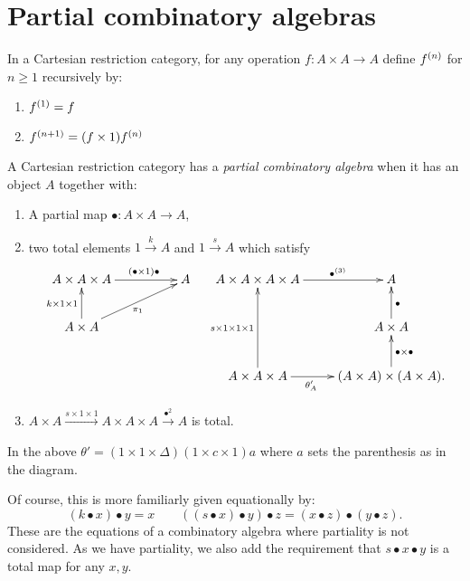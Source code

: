 \section{Partial combinatory algebras}
\label{sec:partial_combinatory_algebras}

In a Cartesian restriction category, for any operation $f:A\times A\to A$ define ${f}^{(n)}$
for $n\ge 1$  recursively by:
\begin{enumerate}[{(}i{)}]
  \item ${f}^{(1)} = f$
  \item ${f}^{(n+1)} = (f\times 1) {f}^{(n)}$
\end{enumerate}

\begin{definition}\label{def:partial_combinatory_algebra}
  A Cartesian restriction category has a \emph{partial combinatory algebra} when it has an object
  $A$ together with:
  \begin{enumerate}[{(}i{)}]
  \item A partial map $\bullet:A\times A \to A$,\label{defitem:pca-1}
  \item two total elements $1\xrightarrow{k}A$ and $1\xrightarrow{s}{A}$ which satisfy\label{defitem:pca-2}
    \[
      \xymatrix@C+25pt{
        A\times A\times A \ar[r]^(.6){(\bullet\times 1)\bullet} & A\\
        A\times A \ar[u]^{k\times1\times1} \ar[ur]_{\pi_1}
      }\quad
      \xymatrix{
        A\times A\times A\times A \ar[r]^(.6){\multibullet{3}}&A\\
        &A\times A \ar[u]_{\bullet}\\
        A\times A\times A \ar[uu]^{s\times1\times1\times1} \ar[r]_(.4){\theta_A'}
          & (A\times A) \times (A\times A). \ar[u]_{\bullet\times\bullet}
      }
    \]
    \item $A\times A \xrightarrow{s\times1\times1} A\times A\times A \xrightarrow{\bullet^2} A$ is total.\label{defitem:pca-3}
  \end{enumerate}
  In the above $\theta' = (1\times1\times\Delta)(1\times c \times 1)a$ where $a$ sets the
  parenthesis as in the diagram.
\end{definition}

Of course, this is more familiarly given equationally by:
\[
   (k\bullet x)\bullet y = x \qquad ((s\bullet x)\bullet y) \bullet z = (x\bullet z) \bullet
   (y\bullet z).
\]
These are the equations of a combinatory algebra where partiality is not considered. As we have
partiality, we also add the requirement that $s\bullet x\bullet y$ is a total map for any $x,y$.

